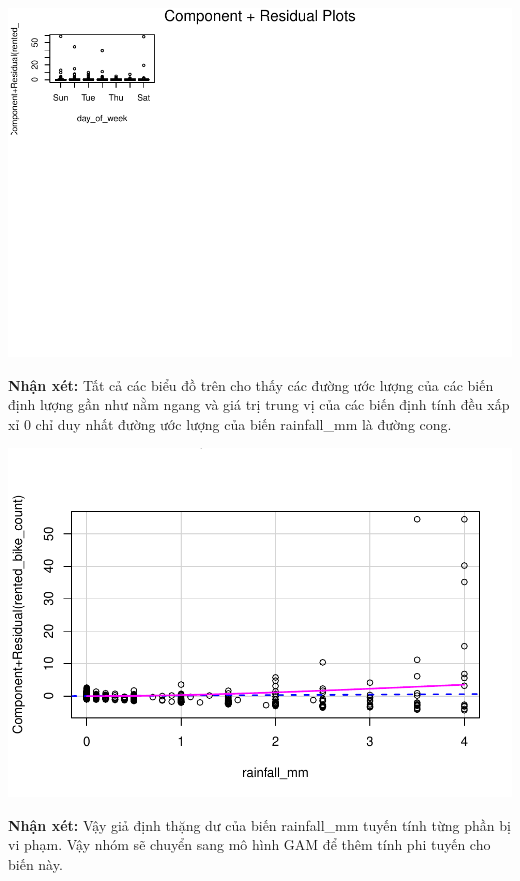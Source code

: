 \documentclass[
  11pt,
  letterpaper,
]{article}
\begin{document}
\begin{center}\includegraphics[width=1.2\linewidth,]{Final_Project_files/figure-latex/unnamed-chunk-39-2} \end{center}

\textbf{Nhận xét:} Tất cả các biểu đồ trên cho thấy các đường ước lượng của các biến định lượng gần như nằm ngang và giá trị trung vị của các biến định tính đều xấp xỉ 0 chỉ duy nhất đường ước lượng của biến rainfall\_mm là đường cong.

\begin{center}\includegraphics[width=1.2\linewidth,]{Final_Project_files/figure-latex/unnamed-chunk-40-1} \end{center}

\textbf{Nhận xét:} Vậy giả định thặng dư của biến rainfall\_mm tuyến tính từng phần bị vi phạm. Vậy nhóm sẽ chuyển sang mô hình GAM để thêm tính phi tuyến cho biến này.
\end{document}
